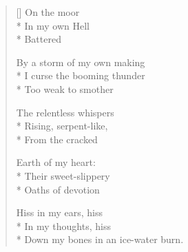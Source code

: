 \label{ch:lear_aw}
\settowidth{\versewidth}{Down my bones in an ice-water burn.}
\begin{verse}[\versewidth]
On the moor\\*
In my own Hell\\*
Battered

By a storm of my own making\\*
I curse the booming thunder\\*
Too weak to smother

The relentless whispers\\*
Rising, serpent-like,\\*
From the cracked

Earth of my heart:\\*
Their sweet-slippery\\*
Oaths of devotion

Hiss in my ears, hiss\\*
In my thoughts, hiss\\*
Down my bones in an ice-water burn.
\end{verse}
